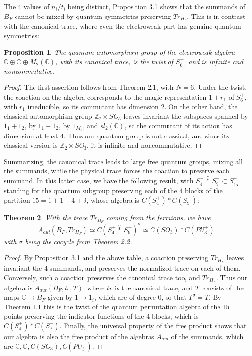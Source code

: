 \documentclass[11pt]{amsart}
\newtheorem{theorem}{Theorem}[section]
\newtheorem{proposition}[theorem]{Proposition}
\theoremstyle{definition}
\begin{document}
The 4 values of $n_i/t_i$ being distinct, Proposition 3.1 shows that the summands of $B_F$ cannot be mixed by quantum symmetries preserving $Tr_{H_F}$. This is in contrast with the canonical trace, where even the electroweak part has genuine quantum symmetries:

\begin{proposition}
The quantum automorphism group of the electroweak algebra $\mathbb C\oplus\mathbb C\oplus M_2(\mathbb C)$, with its canonical trace, is the twist of $S_6^+$, and is infinite and noncommutative.
\end{proposition}

\begin{proof}
The first assertion follows from Theorem 2.1, with $N=6$. Under the twist, the coaction on the algebra corresponds to the magic representation $1+r_1$ of $S_6^+$, with $r_1$ irreducible, so its commutant has dimension $2$. On the other hand, the classical automorphism group $\mathbb Z_2\times SO_3$ leaves invariant the subspaces spanned by $1_1+1_2$, by $1_1-1_2$, by $1_{M_2}$, and $sl_2(\mathbb C)$, so the commutant of its action has dimension at least $4$. Thus our quantum group is not classical, and since its classical version is $\mathbb Z_2\times SO_3$, it is infinite and noncommutative.
\end{proof}

Summarizing, the canonical trace leads to large free quantum groups, mixing all the summands, while the physical trace forces the coaction to preserve each summand. In this latter case, we have the following result, with $S_4^+\,\hat{*}\,S_9^+\subset S_{15}^+$ standing for the quantum subgroup preserving each of the 4 blocks of the partition $15=1+1+4+9$, whose algebra is $C(S_4^+)*C(S_9^+)$:

\begin{theorem}
With the trace $Tr_{H_F}$ coming from the fermions, we have
$$A_{aut}(B_F,Tr_{H_F})\simeq C(S_4^+\,\hat{*}\,S_9^+)^\sigma\simeq C(SO_3)*C(PU_3^+)$$
with $\sigma$ being the cocycle from Theorem 2.2.
\end{theorem}

\begin{proof}
By Proposition 3.1 and the above table, a coaction preserving $Tr_{H_F}$ leaves invariant the 4 summands, and preserves the normalized trace on each of them. Conversely, such a coaction preserves the canonical trace too, and $Tr_{H_F}$. Thus our algebra is $A_{aut}(B_F,tr,T)$, where $tr$ is the canonical trace, and $T$ consists of the maps $\mathbb C\to B_F$ given by $1\to1_i$, which are of degree $0$, so that $T^\sigma=T$. By Theorem 1.1 this is the twist of the quantum permutation algebra of the 15 points preserving the indicator functions of the 4 blocks, which is $C(S_4^+)*C(S_9^+)$. Finally, the universal property of the free product shows that our algebra is also the free product of the algebras $A_{aut}$ of the summands, which are $\mathbb C,\mathbb C,C(SO_3),C(PU_3^+)$.
\end{proof}
\end{document}
